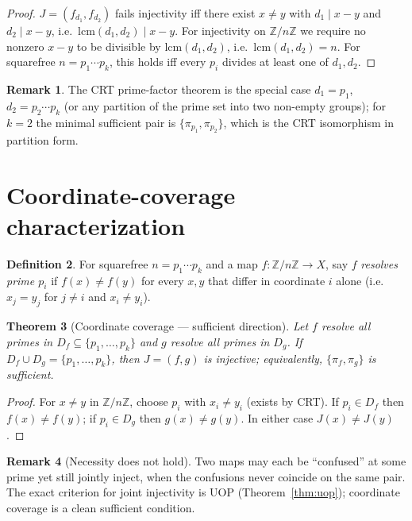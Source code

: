 \documentclass[11pt,reqno]{amsart}
\theoremstyle{plain}
\newtheorem{theorem}{Theorem}
\theoremstyle{definition}
\newtheorem{definition}[theorem]{Definition}
\newtheorem{remark}[theorem]{Remark}
\newcommand{\Z}{\mathbb{Z}}
\newcommand{\Zn}{\Z/n\Z}
\newcommand{\lcm}{\mathrm{lcm}}
\begin{document}
\begin{proof}
$J = (f_{d_1}, f_{d_2})$ fails injectivity iff there exist $x \neq y$ with $d_1 \mid x-y$ and $d_2 \mid x-y$, i.e.\ $\lcm(d_1,d_2) \mid x-y$. For injectivity on $\Zn$ we require no nonzero $x-y$ to be divisible by $\lcm(d_1,d_2)$, i.e.\ $\lcm(d_1,d_2) = n$. For squarefree $n = p_1 \cdots p_k$, this holds iff every $p_i$ divides at least one of $d_1, d_2$.
\end{proof}

\begin{remark}
The CRT prime-factor theorem is the special case $d_1 = p_1$, $d_2 = p_2 \cdots p_k$ (or any partition of the prime set into two non-empty groups); for $k=2$ the minimal sufficient pair is $\{\pi_{p_1}, \pi_{p_2}\}$, which is the CRT isomorphism in partition form.
\end{remark}

\section{Coordinate-coverage characterization} \label{sec:cc}

\begin{definition}
For squarefree $n = p_1 \cdots p_k$ and a map $f \colon \Zn \to X$, say $f$ \emph{resolves prime $p_i$} if $f(x) \neq f(y)$ for every $x,y$ that differ in coordinate $i$ alone (i.e.\ $x_j = y_j$ for $j \neq i$ and $x_i \neq y_i$).
\end{definition}

\begin{theorem}[Coordinate coverage --- sufficient direction] \label{thm:CC}
Let $f$ resolve all primes in $D_f \subseteq \{p_1,\ldots,p_k\}$ and $g$ resolve all primes in $D_g$. If $D_f \cup D_g = \{p_1,\ldots,p_k\}$, then $J = (f,g)$ is injective; equivalently, $\{\pi_f, \pi_g\}$ is sufficient.
\end{theorem}

\begin{proof}
For $x \neq y$ in $\Zn$, choose $p_i$ with $x_i \neq y_i$ (exists by CRT). If $p_i \in D_f$ then $f(x) \neq f(y)$; if $p_i \in D_g$ then $g(x) \neq g(y)$. In either case $J(x) \neq J(y)$.
\end{proof}

\begin{remark}[Necessity does not hold] \label{rem:CC-not-necessary}
Two maps may each be ``confused'' at some prime yet still jointly inject, when the confusions never coincide on the same pair. The exact criterion for joint injectivity is UOP (Theorem~\ref{thm:uop}); coordinate coverage is a clean sufficient condition.
\end{remark}
\end{document}
